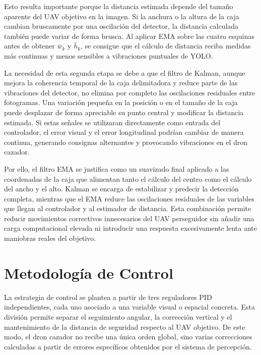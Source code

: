 Esto resulta importante porque la distancia estimada depende del tamaño aparente del UAV objetivo en la imagen. Si la anchura o la altura de la caja cambian bruscamente por una oscilación del detector, la distancia calculada también puede variar de forma brusca. Al aplicar EMA sobre las cuatro esquinas antes de obtener $\bar{w}_k$ y $\bar{h}_k$, se consigue que el cálculo de distancia reciba medidas más continuas y menos sensibles a vibraciones puntuales de YOLO.

\vspace{0.3cm}

La necesidad de esta segunda etapa se debe a que el filtro de Kalman, aunque mejora la coherencia temporal de la caja delimitadora y reduce parte de las vibraciones del detector, no elimina por completo las oscilaciones residuales entre fotogramas. Una variación pequeña en la posición o en el tamaño de la caja puede desplazar de forma apreciable su punto central y modificar la distancia estimada. Si estas señales se utilizaran directamente como entrada del controlador, el error visual y el error longitudinal podrían cambiar de manera continua, generando consignas alternantes y provocando vibraciones en el dron cazador.

\vspace{0.3cm}

Por ello, el filtro EMA se justifica como un suavizado final aplicado a las coordenadas de la caja que alimentan tanto el cálculo del centro como el cálculo del ancho y el alto. Kalman se encarga de estabilizar y predecir la detección completa, mientras que el EMA reduce las oscilaciones residuales de las variables que llegan al controlador y al estimador de distancia. Esta combinación permite reducir movimientos correctivos innecesarios del UAV perseguidor sin añadir una carga computacional elevada ni introducir una respuesta excesivamente lenta ante maniobras reales del objetivo.

\vspace{0.3cm}

\section{Metodología de Control }

La estrategia de control se plantea a partir de tres reguladores PID independientes, cada uno asociado a una variable visual o espacial concreta. Esta división permite separar el seguimiento angular, la corrección vertical y el mantenimiento de la distancia de seguridad respecto al UAV objetivo. De este modo, el dron cazador no recibe una única orden global, sino varias correcciones calculadas a partir de errores específicos obtenidos por el sistema de percepción.

